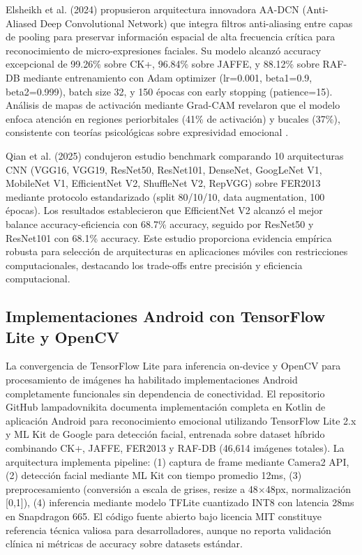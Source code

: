 \documentclass[journal,article,submit,pdftex,moreauthors]{Definitions/mdpi}
\begin{document}
	Elsheikh et al. (2024) \cite{ref8} propusieron arquitectura innovadora AA-DCN (Anti-Aliased Deep Convolutional Network) que integra filtros anti-aliasing entre capas de pooling para preservar información espacial de alta frecuencia crítica para reconocimiento de micro-expresiones faciales. Su modelo alcanzó accuracy excepcional de 99.26\% sobre CK+, 96.84\% sobre JAFFE, y 88.12\% sobre RAF-DB mediante entrenamiento con Adam optimizer (lr=0.001, beta1=0.9, beta2=0.999), batch size 32, y 150 épocas con early stopping (patience=15). Análisis de mapas de activación mediante Grad-CAM revelaron que el modelo enfoca atención en regiones periorbitales (41\% de activación) y bucales (37\%), consistente con teorías psicológicas sobre expresividad emocional \cite{ref11,ref12}.
	
	Qian et al. (2025) \cite{ref10} condujeron estudio benchmark comparando 10 arquitecturas CNN (VGG16, VGG19, ResNet50, ResNet101, DenseNet, GoogLeNet V1, MobileNet V1, EfficientNet V2, ShuffleNet V2, RepVGG) sobre FER2013 mediante protocolo estandarizado (split 80/10/10, data augmentation, 100 épocas). Los resultados establecieron que EfficientNet V2 alcanzó el mejor balance accuracy-eficiencia con 68.7\% accuracy, seguido por ResNet50 y ResNet101 con 68.1\% accuracy. Este estudio proporciona evidencia empírica robusta para selección de arquitecturas en aplicaciones móviles con restricciones computacionales, destacando los trade-offs entre precisión y eficiencia computacional.
	
	\subsection{Implementaciones Android con TensorFlow Lite y OpenCV}
	
	La convergencia de TensorFlow Lite para inferencia on-device y OpenCV para procesamiento de imágenes ha habilitado implementaciones Android completamente funcionales sin dependencia de conectividad. El repositorio GitHub lampadovnikita \cite{ref6} documenta implementación completa en Kotlin de aplicación Android para reconocimiento emocional utilizando TensorFlow Lite 2.x y ML Kit de Google para detección facial, entrenada sobre dataset híbrido combinando CK+, JAFFE, FER2013 y RAF-DB (46,614 imágenes totales). La arquitectura implementa pipeline: (1) captura de frame mediante Camera2 API, (2) detección facial mediante ML Kit con tiempo promedio 12ms, (3) preprocesamiento (conversión a escala de grises, resize a 48$\times$48px, normalización [0,1]), (4) inferencia mediante modelo TFLite cuantizado INT8 con latencia 28ms en Snapdragon 665. El código fuente abierto bajo licencia MIT constituye referencia técnica valiosa para desarrolladores, aunque no reporta validación clínica ni métricas de accuracy sobre datasets estándar.
	
\end{document}
